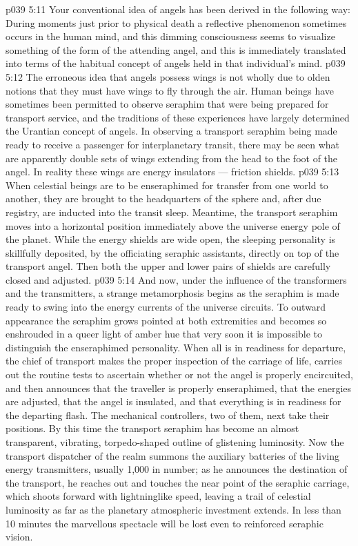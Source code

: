 \vs p039 5:11 \pc Your conventional idea of angels has been derived in the following way: During moments just prior to physical death a reflective phenomenon sometimes occurs in the human mind, and this dimming consciousness seems to visualize something of the form of the attending angel, and this is immediately translated into terms of the habitual concept of angels held in that individual’s mind.
\vs p039 5:12 The erroneous idea that angels possess wings is not wholly due to olden notions that they must have wings to fly through the air. Human beings have sometimes been permitted to observe seraphim that were being prepared for transport service, and the traditions of these experiences have largely determined the Urantian concept of angels. In observing a transport seraphim being made ready to receive a passenger for interplanetary transit, there may be seen what are apparently double sets of wings extending from the head to the foot of the angel. In reality these wings are energy insulators --- friction shields.
\vs p039 5:13 \pc When celestial beings are to be enseraphimed for transfer from one world to another, they are brought to the headquarters of the sphere and, after due registry, are inducted into the transit sleep. Meantime, the transport seraphim moves into a horizontal position immediately above the universe energy pole of the planet. While the energy shields are wide open, the sleeping personality is skillfully deposited, by the officiating seraphic assistants, directly on top of the transport angel. Then both the upper and lower pairs of shields are carefully closed and adjusted.
\vs p039 5:14 And now, under the influence of the transformers and the transmitters, a strange metamorphosis begins as the seraphim is made ready to swing into the energy currents of the universe circuits. To outward appearance the seraphim grows pointed at both extremities and becomes so enshrouded in a queer light of amber hue that very soon it is impossible to distinguish the enseraphimed personality. When all is in readiness for departure, the chief of transport makes the proper inspection of the carriage of life, carries out the routine tests to ascertain whether or not the angel is properly encircuited, and then announces that the traveller is properly enseraphimed, that the energies are adjusted, that the angel is insulated, and that everything is in readiness for the departing flash. The mechanical controllers, two of them, next take their positions. By this time the transport seraphim has become an almost transparent, vibrating, torpedo\hyp{}shaped outline of glistening luminosity. Now the transport dispatcher of the realm summons the auxiliary batteries of the living energy transmitters, usually 1,000 in number; as he announces the destination of the transport, he reaches out and touches the near point of the seraphic carriage, which shoots forward with lightninglike speed, leaving a trail of celestial luminosity as far as the planetary atmospheric investment extends. In less than 10 minutes the marvellous spectacle will be lost even to reinforced seraphic vision.
